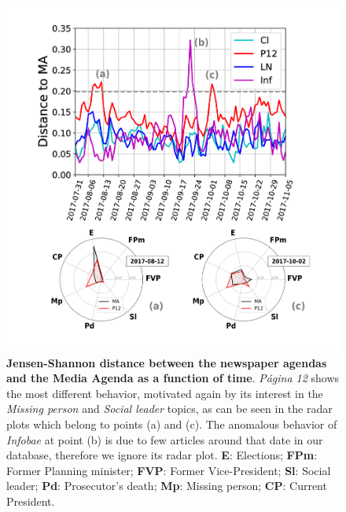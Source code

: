\documentclass{bmcart}
\begin{document}
\begin{backmatter}
\begin{figure}[h!]
\includegraphics[width = \textwidth]{Fig6.pdf}
\caption{\textbf{Jensen-Shannon distance between the newspaper agendas and the Media Agenda as a function of time}. \emph{P\'agina 12} shows the most different behavior, motivated again by its interest in the \emph{Missing person} and \emph{Social leader} topics, as can be seen in the radar plots which belong to points (a) and (c). The anomalous behavior of \emph{Infobae} at point (b) is due to few articles around that date in our database, therefore we ignore its radar plot. \textbf{E}: Elections; \textbf{FPm}: Former Planning minister; \textbf{FVP}: Former Vice-President; \textbf{Sl}: Social leader; \textbf{Pd}: Prosecutor's death; \textbf{Mp}: Missing person; \textbf{CP}: Current President.}
\label{fig:jensen_shannon_news}
\end{figure}


\end{backmatter}
\end{document}
